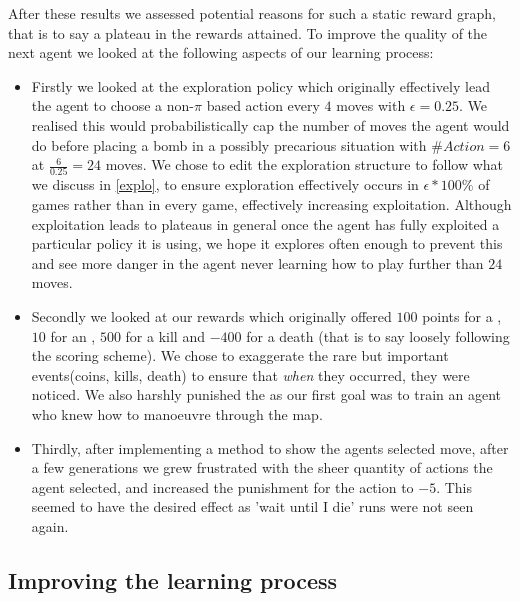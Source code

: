 After these results we assessed potential reasons for such a static reward graph, that is to say a plateau in the rewards attained. To improve the quality of the next agent we looked at the following aspects of our learning process:
\begin{itemize}
	\item Firstly we looked at the exploration policy which originally effectively lead the agent to choose a non-$\pi$ based action every $4$ moves with $\epsilon=0.25$. We realised this would probabilistically cap the number of moves the agent would do before placing a bomb in a possibly precarious situation with $\#Action=6$ at $\frac{6}{0.25}=24$ moves. We chose to edit the exploration structure to follow what we discuss in \ref{explo}, to ensure exploration effectively occurs in $\epsilon*100\%$ of games rather than in every game, effectively increasing exploitation. Although exploitation leads to plateaus in general once the agent has fully exploited a particular policy it is using, we hope it explores often enough to prevent this and see more danger in the agent never learning how to play further than $24$ moves. 
	\item Secondly we looked at our rewards which originally offered $100$ points for a , $10$ for an , $500$ for a kill and $-400$ for a death (that is to say loosely following the scoring scheme). We chose to exaggerate the rare but important events(coins, kills, death) to ensure that \textit{when} they occurred, they were noticed. We also harshly punished the  as our first goal was to train an agent who knew how to manoeuvre through the map.
	\item Thirdly, after implementing a method to show the agents selected move, after a few generations we grew frustrated with the sheer quantity of  actions the agent selected, and increased the punishment for the action to $-5$. This seemed to have the desired effect as 'wait until I die' runs were not seen again.
\end{itemize}

\subsection{Improving the learning process}
